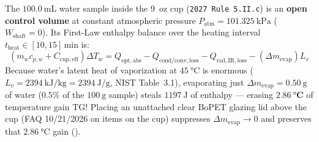 \begin{devicebox}
The $\SI{100.0}{\milli\liter}$ water sample inside the 9~oz cup (\texttt{2027 Rule 5.II.c}) is an \textbf{open control volume} at constant atmospheric pressure $P_{\mathrm{atm}} = \SI{101.325}{\kilo\pascal}$ ($W_{\mathrm{shaft}} = 0$). Its First-Law enthalpy balance over the heating interval $t_{\mathrm{heat}} \in [10, 15]\,\si{\minute}$ is:
\begin{equation}\label{eq:07:cup-first-law}
  (m_w c_{p,w} + C_{\mathrm{cup,eff}})\Delta T_w = Q_{\mathrm{opt,abs}} - Q_{\mathrm{cond/conv,loss}} - Q_{\mathrm{rad,IR,loss}} - (\Delta m_{\mathrm{evap}}) L_v
\end{equation}
Because water's latent heat of vaporization at $\SI{45}{\celsius}$ is enormous ($L_v = \SI{2394}{\kilo\joule\per\kilogram} = \SI{2394}{\joule\per\gram}$, NIST Table~3.1), evaporating just $\Delta m_{\mathrm{evap}} = \SI{0.50}{\gram}$ of water ($0.5\%$ of the $\SI{100}{\gram}$ sample) steals $\SI{1197}{\joule}$ of enthalpy — erasing $\mathbf{\SI{2.86}{\celsius}}$ of temperature gain $\mathrm{TG}$! Placing an unattached clear BoPET glazing lid above the cup (FAQ 10/21/2026 on items on the cup) suppresses $\Delta m_{\mathrm{evap}} \to 0$ and preserves that $\SI{2.86}{\celsius}$ gain ().
\end{devicebox}

